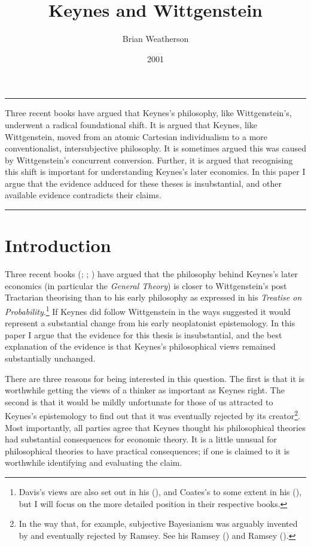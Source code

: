 \documentclass[
  10pt,
  letterpaper,
  DIV=11,
  numbers=noendperiod,
  twoside]{scrartcl}
\title{Keynes and Wittgenstein}
\author{Brian Weatherson}
\date{2001}
\renewenvironment{abstract}
 {\vspace{-1.25cm}
 \quotation\small\noindent\rule{\linewidth}{.5pt}\par\smallskip
 \noindent }
 {\par\noindent\rule{\linewidth}{.5pt}\endquotation}
\begin{document}
\maketitle
\begin{abstract}
Three recent books have argued that Keynes's philosophy, like
Wittgenstein's, underwent a radical foundational shift. It is argued
that Keynes, like Wittgenstein, moved from an atomic Cartesian
individualism to a more conventionalist, intersubjective philosophy. It
is sometimes argued this was caused by Wittgenstein's concurrent
conversion. Further, it is argued that recognising this shift is
important for understanding Keynes's later economics. In this paper I
argue that the evidence adduced for these theses is insubstantial, and
other available evidence contradicts their claims.
\end{abstract}

\section{Introduction}\label{introduction}

Three recent books (;
;
) have argued that the philosophy
behind Keynes's later economics (in particular the \emph{General
Theory}) is closer to Wittgenstein's post Tractarian theorising than to
his early philosophy as expressed in his \emph{Treatise on
Probability}.\footnote{Davis's views are also set out in his
  (), and Coates's to some extent in his
  (), but I will focus on the more
  detailed position in their respective books.} If Keynes did follow
Wittgenstein in the ways suggested it would represent a substantial
change from his early neoplatonist epistemology. In this paper I argue
that the evidence for this thesis is insubstantial, and the best
explanation of the evidence is that Keynes's philosophical views
remained substantially unchanged.

There are three reasons for being interested in this question. The first
is that it is worthwhile getting the views of a thinker as important as
Keynes right. The second is that it would be mildly unfortunate for
those of us attracted to Keynes's epistemology to find out that it was
eventually rejected by its creator\footnote{In the way that, for
  example, subjective Bayesianism was arguably invented by and
  eventually rejected by Ramsey. See his Ramsey
  () and Ramsey
  ().}. Most importantly, all
parties agree that Keynes thought his philosophical theories had
substantial consequences for economic theory. It is a little unusual for
philosophical theories to have practical consequences; if one is claimed
to it is worthwhile identifying and evaluating the claim.
\end{document}
